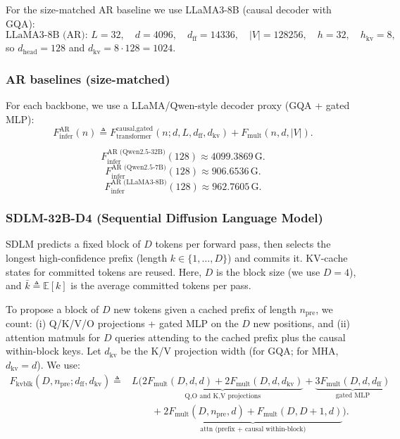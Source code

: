 \documentclass[11pt]{article}
\newcommand{\G}{\mathrm{G}} %
\begin{document}
For the size-matched AR baseline we use LLaMA3-8B (causal decoder with GQA):
\[
\text{LLaMA3-8B (AR): } L=32,\quad d=4096,\quad d_{\text{ff}}=14336,\quad |V|=128256,\quad
h=32,\quad h_{\text{kv}}=8,
\]
so $d_{\text{head}}=128$ and $d_{\text{kv}}=8\cdot 128=1024$.

\subsubsection{AR baselines (size-matched)}
\label{app:diff_family_big_ar}

For each backbone, we use a LLaMA/Qwen-style decoder proxy (GQA + gated MLP):
\[
F_{\text{infer}}^{\text{AR}}(n)
\triangleq
F_{\text{transformer}}^{\text{causal,gated}}(n; d,L,d_{\text{ff}},d_{\text{kv}})
+
F_{\text{mult}}(n,d,|V|).
\]

\[
F_{\text{infer}}^{\text{AR (Qwen2.5-32B)}}(128)\approx \num{4099.3869}\,\G.
\]
\[
F_{\text{infer}}^{\text{AR (Qwen2.5-7B)}}(128)\approx \num{906.6536}\,\G.
\]
\[
F_{\text{infer}}^{\text{AR (LLaMA3-8B)}}(128)\approx \num{962.7605}\,\G.
\]

\subsubsection{SDLM-32B-D4 (Sequential Diffusion Language Model)}
\label{app:sdlm_32b}

SDLM predicts a fixed block of $D$ tokens per forward pass, then selects the longest high-confidence
prefix (length $k\in\{1,\dots,D\}$) and commits it. KV-cache states for committed tokens are reused.
Here, $D$ is the block size (we use $D=4$), and $\bar{k}\triangleq \mathbb{E}[k]$ is the average committed tokens per pass.

To propose a block of $D$ new tokens given a cached prefix of length $n_{\text{pre}}$, we count:
(i) Q/K/V/O projections + gated MLP on the $D$ new positions, and
(ii) attention matmuls for $D$ queries attending to the cached prefix plus the causal within-block keys.
Let $d_{\text{kv}}$ be the K/V projection width (for GQA; for MHA, $d_{\text{kv}}=d$). We use:
\[
\begin{aligned}
F_{\text{kvblk}}(D,n_{\text{pre}}; d_{\text{ff}}, d_{\text{kv}})
\triangleq {}& L\Big(
\underbrace{2F_{\text{mult}}(D,d,d)+2F_{\text{mult}}(D,d,d_{\text{kv}})}_{\text{Q,O and K,V projections}}
+\underbrace{3F_{\text{mult}}(D,d,d_{\text{ff}})}_{\text{gated MLP}}
\\
&\qquad
+\underbrace{2F_{\text{mult}}(D,n_{\text{pre}},d)+F_{\text{mult}}(D,D{+}1,d)}_{\text{attn (prefix + causal within-block)}}
\Big).
\end{aligned}
\]
\end{document}

